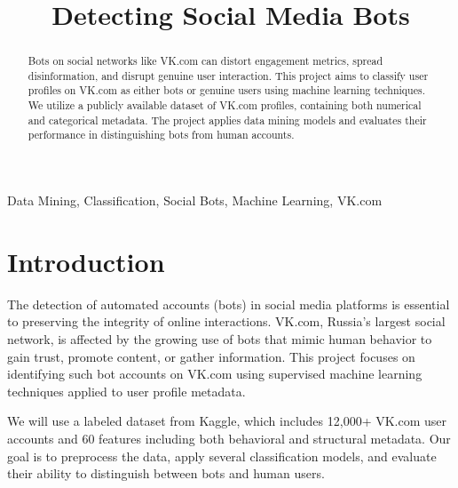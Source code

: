 \documentclass[conference]{IEEEtran}
\begin{document}
\title{Detecting Social Media Bots}

\author{
}

\maketitle

\begin{abstract}
Bots on social networks like VK.com can distort engagement metrics, spread disinformation, and disrupt genuine user interaction. This project aims to classify user profiles on VK.com as either bots or genuine users using machine learning techniques. We utilize a publicly available dataset of VK.com profiles, containing both numerical and categorical metadata. The project applies data mining models and evaluates their performance in distinguishing bots from human accounts.
\end{abstract}

\begin{IEEEkeywords}
Data Mining, Classification, Social Bots, Machine Learning, VK.com
\end{IEEEkeywords}

\section{Introduction}
The detection of automated accounts (bots) in social media platforms is essential to preserving the integrity of online interactions. VK.com, Russia’s largest social network, is affected by the growing use of bots that mimic human behavior to gain trust, promote content, or gather information. This project focuses on identifying such bot accounts on VK.com using supervised machine learning techniques applied to user profile metadata.

We will use a labeled dataset from Kaggle, which includes 12,000+ VK.com user accounts and 60 features including both behavioral and structural metadata. Our goal is to preprocess the data, apply several classification models, and evaluate their ability to distinguish between bots and human users.
\end{document}
